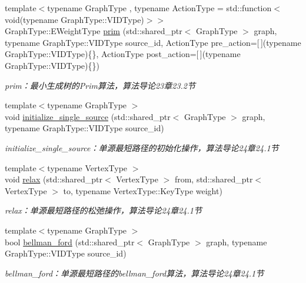 \begin{DoxyCompactItemize}
{\footnotesize template$<$typename Graph\+Type , typename Action\+Type  = std\+::function$<$ void(typename Graph\+Type\+::\+V\+I\+D\+Type)$>$$>$ }\\Graph\+Type\+::\+E\+Weight\+Type \hyperlink{namespace_introduction_to_algorithm_1_1_graph_algorithm_aba1581358d79ba82dc4fd0c15bc987e6}{prim} (std\+::shared\+\_\+ptr$<$ Graph\+Type $>$ graph, typename Graph\+Type\+::\+V\+I\+D\+Type source\+\_\+id, Action\+Type pre\+\_\+action=\mbox{[}$\,$\mbox{]}(typename Graph\+Type\+::\+V\+I\+D\+Type)\{\}, Action\+Type post\+\_\+action=\mbox{[}$\,$\mbox{]}(typename Graph\+Type\+::\+V\+I\+D\+Type)\{\})
\begin{DoxyCompactList}\small\item\em prim：最小生成树的\+Prim算法，算法导论23章23.2节 \end{DoxyCompactList}\item 
{\footnotesize template$<$typename Graph\+Type $>$ }\\void \hyperlink{namespace_introduction_to_algorithm_1_1_graph_algorithm_a5ed496e8825564d0f9fcfe3b0ac41dec}{initialize\+\_\+single\+\_\+source} (std\+::shared\+\_\+ptr$<$ Graph\+Type $>$ graph, typename Graph\+Type\+::\+V\+I\+D\+Type source\+\_\+id)
\begin{DoxyCompactList}\small\item\em initialize\+\_\+single\+\_\+source：单源最短路径的初始化操作，算法导论24章24.1节 \end{DoxyCompactList}\item 
{\footnotesize template$<$typename Vertex\+Type $>$ }\\void \hyperlink{namespace_introduction_to_algorithm_1_1_graph_algorithm_afe2bd83fca7df7e07ece9a59b8e7f5a6}{relax} (std\+::shared\+\_\+ptr$<$ Vertex\+Type $>$ from, std\+::shared\+\_\+ptr$<$ Vertex\+Type $>$ to, typename Vertex\+Type\+::\+Key\+Type weight)
\begin{DoxyCompactList}\small\item\em relax：单源最短路径的松弛操作，算法导论24章24.1节 \end{DoxyCompactList}\item 
{\footnotesize template$<$typename Graph\+Type $>$ }\\bool \hyperlink{namespace_introduction_to_algorithm_1_1_graph_algorithm_ae96d9b844260ee3ce9225055040c631b}{bellman\+\_\+ford} (std\+::shared\+\_\+ptr$<$ Graph\+Type $>$ graph, typename Graph\+Type\+::\+V\+I\+D\+Type source\+\_\+id)
\begin{DoxyCompactList}\small\item\em bellman\+\_\+ford：单源最短路径的bellman\+\_\+ford算法，算法导论24章24.1节 \end{DoxyCompactList}\item 

\end{DoxyCompactItemize}
